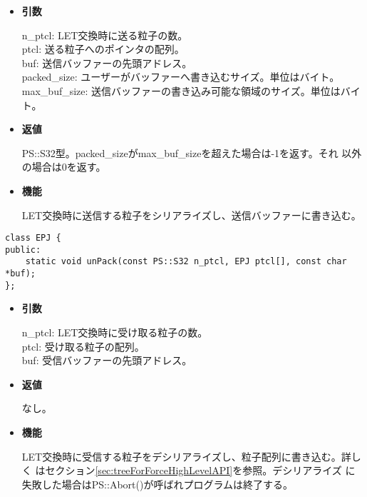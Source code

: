 \begin{itemize}

\item {\bf 引数}

  n\_ptcl: LET交換時に送る粒子の数。\\
  ptcl: 送る粒子へのポインタの配列。\\
  buf: 送信バッファーの先頭アドレス。\\
  packed\_size: ユーザーがバッファーへ書き込むサイズ。単位はバイト。\\
  max\_buf\_size: 送信バッファーの書き込み可能な領域のサイズ。単位はバイト。

\item {\bf 返値}

  PS::S32型。packed\_sizeがmax\_buf\_sizeを超えた場合は-1を返す。それ
  以外の場合は0を返す。
  
\item {\bf 機能}

  LET交換時に送信する粒子をシリアライズし、送信バッファーに書き込む。

\end{itemize}



\begin{screen}
\begin{verbatim}
class EPJ {
public:
    static void unPack(const PS::S32 n_ptcl, EPJ ptcl[], const char *buf);
};
\end{verbatim}
\end{screen}

\begin{itemize}

\item {\bf 引数}

  n\_ptcl: LET交換時に受け取る粒子の数。\\
  ptcl: 受け取る粒子の配列。\\
  buf: 受信バッファーの先頭アドレス。\\

\item {\bf 返値}

  なし。

\item {\bf 機能}

 LET交換時に受信する粒子をデシリアライズし、粒子配列に書き込む。詳しく
 はセクション\ref{sec:treeForForceHighLevelAPI}を参照。デシリアライズ
 に失敗した場合はPS::Abort()が呼ばれプログラムは終了する。

\end{itemize}
